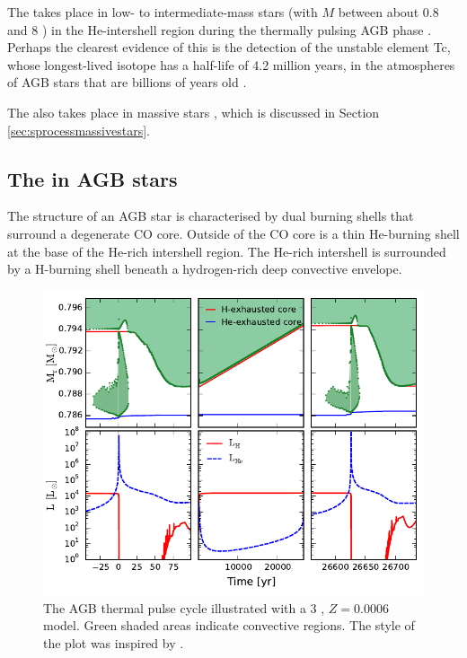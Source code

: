 The \sprocess takes place in low- to intermediate-mass stars (with $M$ between about 0.8 and 8 \Msun) in the He-intershell region during the thermally pulsing \gls{AGB} phase \citep{Sanders:1967bm,Straniero:1995ed,Busso:1999ig}. Perhaps the clearest evidence of this is the detection of the unstable element Tc, whose longest-lived isotope has a half-life of 4.2 million years, in the atmospheres of AGB stars that are billions of years old \citep{Merrill:1952fi,Uttenthaler:2007hu}.

The \sprocess also takes place in massive stars \citep{Raiteri:1993ff}, which is discussed in Section \ref{sec:sprocessmassivestars}.

\subsection{The \sprocess in AGB stars}
The structure of an \gls{AGB} star is characterised by dual burning shells that surround a degenerate CO core. Outside of the CO core is a thin He-burning shell at the base of the He-rich intershell region. The He-rich intershell is surrounded by a H-burning shell beneath a hydrogen-rich deep convective envelope.

\begin{figure}
 \begin{center}\includegraphics[width=\textwidth]{fig-tpcycle}\end{center}
 \caption{The AGB thermal pulse cycle illustrated with a 3 \Msun, $Z=0.0006$ model. Green shaded areas indicate convective regions. The style of the plot was inspired by \citet[][Figure 3]{Herwig:2005jn}.}\label{fig:tpcycle}
\end{figure}

